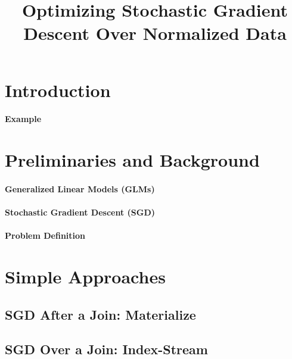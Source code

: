 \documentclass{vldb}
\begin{document}
\title{Optimizing Stochastic Gradient Descent Over Normalized Data}


\maketitle

\begin{abstract}

\end{abstract}


\section{Introduction}

\paragraph*{Example}



\section{Preliminaries and Background}

\paragraph*{Generalized Linear Models (GLMs)}

\paragraph*{Stochastic Gradient Descent (SGD)}

\paragraph*{Problem Definition}



\section{Simple Approaches}

\subsection{SGD After a Join: Materialize}

\subsection{SGD Over a Join: Index-Stream}
\end{document}
